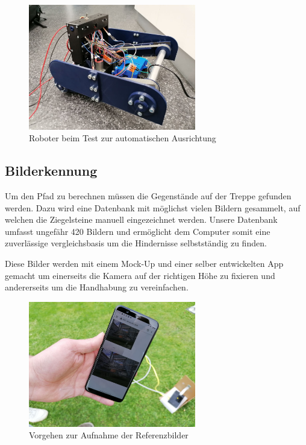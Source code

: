 \begin{figure}[H]
  \includegraphics[width=0.65\textwidth]{img/Sprint2/pren2_ausrichten-anfahren.jpg}
  \centering
  \caption{Roboter beim Test zur automatischen Ausrichtung}
  \label{fig:sprint-backlog-1}
  \end{figure}
  
  
\subsection{Bilderkennung}

Um den Pfad zu berechnen müssen die Gegenstände auf der Treppe gefunden werden. Dazu wird eine Datenbank mit möglichst vielen Bildern gesammelt, auf welchen die Ziegelsteine manuell eingezeichnet werden. Unsere Datenbank umfasst ungefähr 420 Bildern und ermöglicht dem Computer somit eine zuverlässige vergleichsbasis um die Hindernisse selbstständig zu finden.

Diese Bilder werden mit einem Mock-Up und einer selber entwickelten App gemacht um einerseits die Kamera auf der richtigen Höhe zu fixieren und andererseits um die Handhabung zu vereinfachen.



\begin{figure}[H]
  \includegraphics[width=0.65\textwidth]{img/Sprint3/Sprint3_Bildersammlung.jpeg}
  \centering
  \caption{Vorgehen zur Aufnahme der Referenzbilder}
  \label{fig:Aufnahme der Referenzbilder}
  \end{figure}
  
